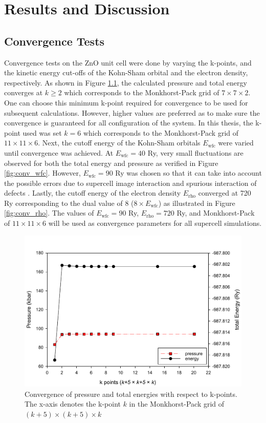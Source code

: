 \chapter{Results and Discussion} \label{chap:rnd}
\section{Convergence Tests}
Convergence tests on the ZnO unit cell were done by varying the k-points, and the kinetic energy cut-offs  of the Kohn-Sham orbital and the electron density, respectively.  As shown in Figure \ref{fig:conv_k}, the calculated pressure and total energy converges at $k \geq 2$ which corresponds to the Monkhorst-Pack grid of $7 \times 7 \times 2$. One can choose this minimum k-point required for convergence to be used for subsequent calculations. However, higher values are preferred as to make sure the convergence is guaranteed for all configuration of the system. In this thesis, the k-point used was set $k = 6$ which corresponds to the Monkhorst-Pack grid of $11 \times 11 \times 6$. Next, the cutoff energy of the Kohn-Sham orbitals $E_{\text{wfc}}$ were varied until convergence was achieved. At $E_{\text{wfc}} = 40$ Ry, very small fluctuations are observed for both the total energy and pressure as verified in Figure \ref{fig:conv_wfc}. However, $E_{\text{wfc}} = 90$ Ry was chosen so that it can take into account the possible errors due to supercell image interaction and spurious interaction of defects \citep{White1994,Makov1995,Martyna1999}. Lastly, the cutoff energy of the electron density $E_{\text{rho}}$ converged at 720 Ry corresponding to the dual value of 8 ($8 \times E_{\text{wfc}}$) as illustrated in Figure \ref{fig:conv_rho}. The values of $E_{\text{wfc}} = 90$ Ry, $E_{\text{rho}} = 720$ Ry, and Monkhorst-Pack of $11 \times 11 \times 6$ will be used as convergence parameters for all supercell simulations.

\begin{figure}[tbh!]
	\centering
	\includegraphics[width=0.7\linewidth]{"images/rnd/kpoints"}
	\caption[Convergence of pressure and total energies with respect to k-points]{Convergence of pressure and total energies with respect to k-points. The x-axis denotes the k-point $k$ in the Monkhorst-Pack grid of $(k+5) \times (k +5 ) \times k$}
	\label{fig:conv_k}
\end{figure}

